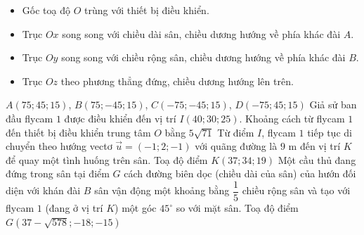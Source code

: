 \begin{ex}
{
}
\begin{itemize}
	\item Gốc toạ độ $O$ trùng với thiết bị điều khiển.
	\item Trục $Ox$ song song với chiều dài sân, chiều dương hướng về phía khác đài $A$.
	\item Trục $Oy$ song song với chiều rộng sân, chiều dương hướng về phía khác đài $B$.
	\item Trục $Oz$ theo phương thẳng đứng, chiều dương hướng lên trên.
 \end{itemize}
\choiceTF
{\True $A(75 ; 45 ; 15)$, $B(75 ;-45 ; 15)$, $C(-75 ;-45 ; 15)$, $D(-75 ; 45 ; 15)$}
{Giả sử ban đầu flycam $1$ được điều khiển đến vị trí $I(40;30;25)$. Khoảng cách từ flycam $1$ đến thiết bị điều khiển trung tâm $O$ bằng $5\sqrt{71}$}
{Từ điểm $I$, flycam $1$ tiếp tục di chuyển theo hướng vectơ $\overrightarrow{u}=\left(-1;2;-1\right)$ với quãng đường là $9$ m đến vị trí $K$ để quay một tình huống trên sân. Toạ độ điểm $K(37;34;19)$}
{Một cầu thủ đang đứng trong sân tại điểm $G$ cách đường biên dọc (chiều dài của sân) của hướn đối diện với khán đài $B$ sân vận động một khoảng bằng $\dfrac{1}{5}$ chiều rộng sân và tạo với flycam $1$ (đang ở vị trí $K$) một góc $45^{\circ}$ so với mặt sân. Toạ độ điểm $G\left(37-\sqrt{578};-18;-15\right)$}
\end{ex}
